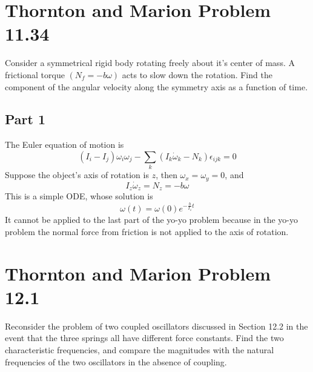 \pagebreak
\section{Thornton and Marion Problem 11.34}
Consider a symmetrical rigid body rotating freely about it's center of mass. A frictional torque $(N_f = -b\omega)$ acts to slow down the rotation. Find the component of the angular velocity along the symmetry axis as a function of time.

\subsection{Part 1}
The Euler equation of motion is
\begin{equation}
    (I_i-I_j)\omega_i\omega_j-\sum_k(I_k\dot{\omega}_k-N_k)\epsilon_{ijk} = 0
\end{equation}
Suppose the object's axis of rotation is $z$, then $\omega_x = \omega_y = 0$, and
\begin{equation}
    I_z\dot{\omega}_z = N_z = -b\omega
\end{equation}
This is a simple ODE, whose solution is
\begin{equation}
    \omega(t) = \omega(0)e^{-\frac{b}{I_z}t}
\end{equation}
It cannot be applied to the last part of the yo-yo problem because in the yo-yo problem the normal force from friction is not applied to the axis of rotation.

\pagebreak
\section{Thornton and Marion Problem 12.1}
Reconsider the problem of two coupled oscillators discussed in Section 12.2 in the event that the three springs all have different force constants. Find the two characteristic frequencies, and compare the magnitudes with the natural frequencies of the two oscillators in the absence of coupling.

